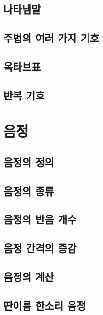 \documentclass[12pt, a4paper, oneside]{book}
\let\stdsection\section
\renewcommand\section{\newpage\stdsection}
\begin{document}
	\subsection{나타냄말}

	\subsection{주법의 여러 가지 기호}

	\subsection{옥타브표}

	\subsection{반복 기호}

%
	\section{음정}

	\subsection{음정의 정의}

	\subsection{음정의 종류}

	\subsection{음정의 반음 개수}

	\subsection{음정 간격의 증감}

	\subsection{음정의 계산}

	\subsection{딴이름 한소리 음정}
\end{document}
